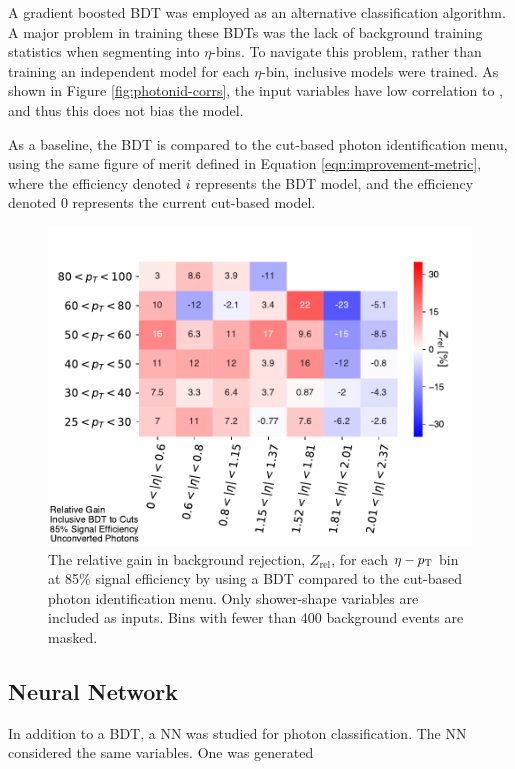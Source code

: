 A gradient boosted \gls{BDT} was employed as an alternative classification algorithm. A major problem in training these \glspl{BDT} was the lack of background training statistics when segmenting into $\eta$-\pt bins. To navigate this problem, rather than training an independent model for each $\eta$-\pt bin, \pt inclusive models were trained. As shown in Figure \ref{fig:photonid-corrs}, the input variables have low correlation to \pt, and thus this does not bias the model.


As a baseline, the \gls{BDT} is compared to the cut-based photon identification menu, using the same figure of merit defined in Equation \ref{eqn:improvement-metric}, where the efficiency denoted $i$ represents the \gls{BDT} model, and the efficiency denoted $0$ represents the current cut-based model.


\begin{figure}[!th]
    \centering
    \includegraphics[width=.85\textwidth]{chapters/chapter4_photonID/images/gain_BDTinclusive_cuts_unconverted.pdf}
    \caption[The relative gain in background rejection, $Z_{\text{rel}}$, for each $\eta-\pt$ bin at 85\% signal efficiency by using a \gls{BDT} compared to the cut-based photon identification menu]
    {The relative gain in background rejection, $Z_{\text{rel}}$, for each $\eta-\pt$ bin at 85\% signal efficiency by using a \gls{BDT} compared to the cut-based photon identification menu. Only shower-shape variables are included as inputs. Bins with fewer than 400 background events are masked.}
    \label{fig:gain-topo-clusters-added-unconverted}
\end{figure}


\subsection{Neural Network}

In addition to a \gls{BDT}, a \gls{NN} was studied for photon classification. The \gls{NN} considered the same variables. One was generated 